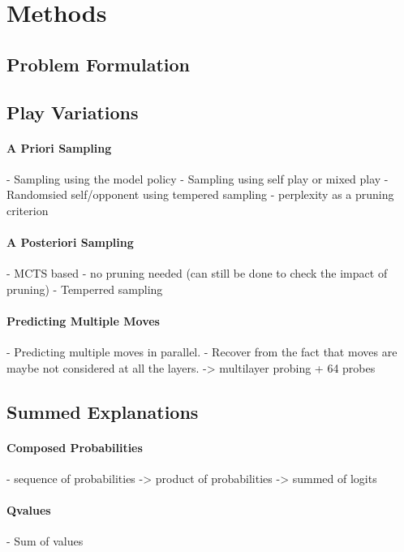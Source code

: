 \section{Methods}

\subsection{Problem Formulation}

\subsection{Play Variations}
\paragraph{A Priori Sampling}
- Sampling using the model policy
- Sampling using self play or mixed play
- Randomsied self/opponent using tempered sampling
- perplexity as a pruning criterion

\paragraph{A Posteriori Sampling}
- MCTS based
- no pruning needed (can still be done to check the impact of pruning)
- Temperred sampling

\paragraph{Predicting Multiple Moves}
- Predicting multiple moves in parallel.
- Recover from the fact that moves are maybe not considered at all the layers.
-> multilayer probing + 64 probes

\subsection{Summed Explanations}
\paragraph{Composed Probabilities}
- sequence of probabilities -> product of probabilities -> summed of logits
\paragraph{Qvalues}
- Sum of values
